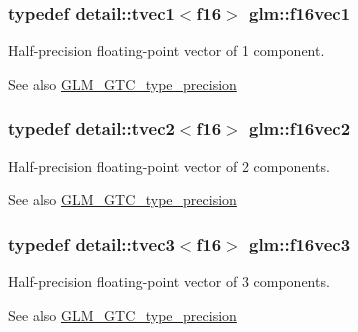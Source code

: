 \subsubsection[{f16vec1}]{\setlength{\rightskip}{0pt plus 5cm}typedef detail\+::tvec1$<$f16$>$ {\bf glm\+::f16vec1}}\label{group__gtc__type__precision_ga56f4754172a1f0fb186d95e865106f5a}
Half-\/precision floating-\/point vector of 1 component. \begin{DoxySeeAlso}{See also}
\hyperlink{group__gtc__type__precision}{G\+L\+M\+\_\+\+G\+T\+C\+\_\+type\+\_\+precision} 
\end{DoxySeeAlso}
\hypertarget{group__gtc__type__precision_gaba661ca6411ee721e3db5b42ff2755a3}{}
\subsubsection[{f16vec2}]{\setlength{\rightskip}{0pt plus 5cm}typedef detail\+::tvec2$<$f16$>$ {\bf glm\+::f16vec2}}\label{group__gtc__type__precision_gaba661ca6411ee721e3db5b42ff2755a3}
Half-\/precision floating-\/point vector of 2 components. \begin{DoxySeeAlso}{See also}
\hyperlink{group__gtc__type__precision}{G\+L\+M\+\_\+\+G\+T\+C\+\_\+type\+\_\+precision} 
\end{DoxySeeAlso}
\hypertarget{group__gtc__type__precision_gaf59829bded825811f821a3e2aaf6db04}{}
\subsubsection[{f16vec3}]{\setlength{\rightskip}{0pt plus 5cm}typedef detail\+::tvec3$<$f16$>$ {\bf glm\+::f16vec3}}\label{group__gtc__type__precision_gaf59829bded825811f821a3e2aaf6db04}
Half-\/precision floating-\/point vector of 3 components. \begin{DoxySeeAlso}{See also}
\hyperlink{group__gtc__type__precision}{G\+L\+M\+\_\+\+G\+T\+C\+\_\+type\+\_\+precision} 
\end{DoxySeeAlso}
\hypertarget{group__gtc__type__precision_gabf914b5cb8fad08b5897f53e7560a2de}{}
